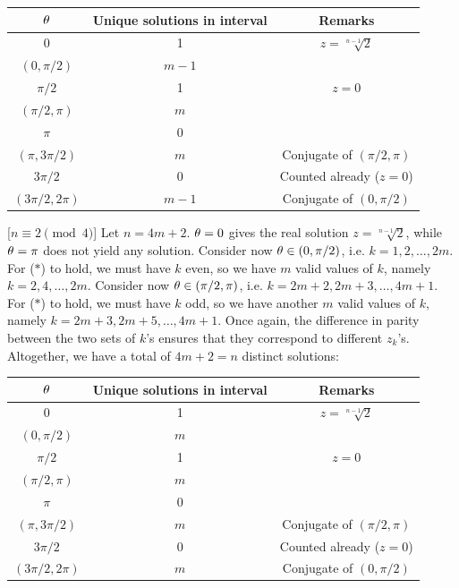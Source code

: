 \begin{solution}
    \begin{table}[H]
        \centering
        \begin{tabular}{|c|c|c|}
        \hline
        $\theta$ & Unique solutions in interval & Remarks \\ \hline\hline
        0 & 1 & $z = \sqrt[n-1]{2}$ \\ \hline
        $(0, \pi/2)$ & $m-1$ &  \\ \hline
        $\pi/2$ & 1 & $z = 0$ \\ \hline
        $(\pi/2, \pi)$ & $m$ &  \\ \hline
        $\pi$ & 0 &  \\ \hline
        $(\pi, 3\pi/2)$ & $m$ &  Conjugate of $(\pi/2, \pi)$\\ \hline
        $3\pi/2$ & 0 & Counted already ($z = 0$) \\ \hline
        $(3\pi/2, 2\pi)$ & $m-1$ & Conjugate of $(0, \pi/2)$ \\ \hline
        \end{tabular}
    \end{table}

    [$n \equiv 2 \pmod{4}$] Let $n = 4m + 2$. $\theta = 0$ gives the real solution $z = \sqrt[n-1]{2}$, while $\theta = \pi$ does not yield any solution. Consider now $\theta \in (0, \pi/2)$, i.e. $k = 1, 2, \dots, 2m$. For ($\ast$) to hold, we must have $k$ even, so we have $m$ valid values of $k$, namely $k = 2, 4, \dots, 2m$. Consider now $\theta \in (\pi/2, \pi)$, i.e. $k = 2m+2, 2m+3, \dots, 4m+1$. For ($\ast$) to hold, we must have $k$ odd, so we have another $m$ valid values of $k$, namely $k = 2m+3, 2m+5, \dots, 4m+1$. Once again, the difference in parity between the two sets of $k$'s ensures that they correspond to different $z_k$'s. Altogether, we have a total of $4m+2 = n$ distinct solutions:

    \begin{table}[H]
        \centering
        \begin{tabular}{|c|c|c|}
        \hline
        $\theta$ & Unique solutions in interval & Remarks \\ \hline\hline
        0 & 1 & $z = \sqrt[n-1]{2}$ \\ \hline
        $(0, \pi/2)$ & $m$ &  \\ \hline
        $\pi/2$ & 1 & $z = 0$ \\ \hline
        $(\pi/2, \pi)$ & $m$ &  \\ \hline
        $\pi$ & 0 &  \\ \hline
        $(\pi, 3\pi/2)$ & $m$ &  Conjugate of $(\pi/2, \pi)$\\ \hline
        $3\pi/2$ & 0 & Counted already ($z = 0$) \\ \hline
        $(3\pi/2, 2\pi)$ & $m$ & Conjugate of $(0, \pi/2)$ \\ \hline
        \end{tabular}
    \end{table}


\end{solution}
